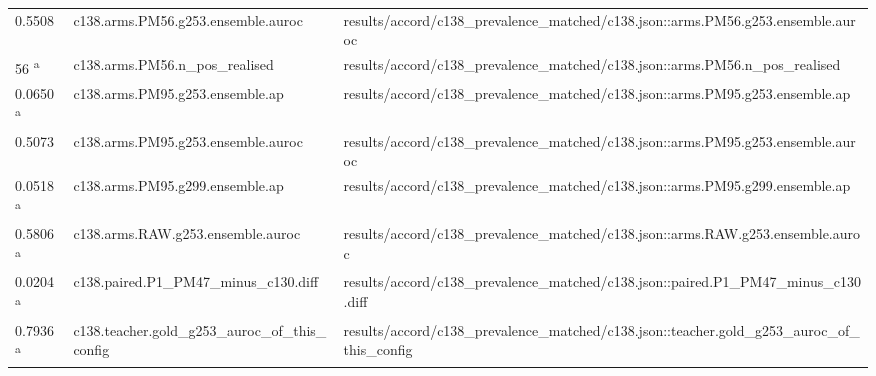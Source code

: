 \begin{longtable}{@{}p{0.7in}p{1.9in}p{2.6in}@{}}
0.5508 & c138.\allowbreak{}arms.\allowbreak{}PM56.\allowbreak{}g253.\allowbreak{}ensemble.\allowbreak{}auroc & results/\allowbreak{}accord/\allowbreak{}c138\_prevalence\_matched/\allowbreak{}c138.\allowbreak{}json::arms.\allowbreak{}PM56.\allowbreak{}g253.\allowbreak{}ensemble.\allowbreak{}auroc\\
56 \textsuperscript{a} & c138.\allowbreak{}arms.\allowbreak{}PM56.\allowbreak{}n\_pos\_realised & results/\allowbreak{}accord/\allowbreak{}c138\_prevalence\_matched/\allowbreak{}c138.\allowbreak{}json::arms.\allowbreak{}PM56.\allowbreak{}n\_pos\_realised\\
0.0650 \textsuperscript{a} & c138.\allowbreak{}arms.\allowbreak{}PM95.\allowbreak{}g253.\allowbreak{}ensemble.\allowbreak{}ap & results/\allowbreak{}accord/\allowbreak{}c138\_prevalence\_matched/\allowbreak{}c138.\allowbreak{}json::arms.\allowbreak{}PM95.\allowbreak{}g253.\allowbreak{}ensemble.\allowbreak{}ap\\
0.5073 & c138.\allowbreak{}arms.\allowbreak{}PM95.\allowbreak{}g253.\allowbreak{}ensemble.\allowbreak{}auroc & results/\allowbreak{}accord/\allowbreak{}c138\_prevalence\_matched/\allowbreak{}c138.\allowbreak{}json::arms.\allowbreak{}PM95.\allowbreak{}g253.\allowbreak{}ensemble.\allowbreak{}auroc\\
0.0518 \textsuperscript{a} & c138.\allowbreak{}arms.\allowbreak{}PM95.\allowbreak{}g299.\allowbreak{}ensemble.\allowbreak{}ap & results/\allowbreak{}accord/\allowbreak{}c138\_prevalence\_matched/\allowbreak{}c138.\allowbreak{}json::arms.\allowbreak{}PM95.\allowbreak{}g299.\allowbreak{}ensemble.\allowbreak{}ap\\
0.5806 \textsuperscript{a} & c138.\allowbreak{}arms.\allowbreak{}RAW.\allowbreak{}g253.\allowbreak{}ensemble.\allowbreak{}auroc & results/\allowbreak{}accord/\allowbreak{}c138\_prevalence\_matched/\allowbreak{}c138.\allowbreak{}json::arms.\allowbreak{}RAW.\allowbreak{}g253.\allowbreak{}ensemble.\allowbreak{}auroc\\
0.0204 \textsuperscript{a} & c138.\allowbreak{}paired.\allowbreak{}P1\_PM47\_minus\_c130.\allowbreak{}diff & results/\allowbreak{}accord/\allowbreak{}c138\_prevalence\_matched/\allowbreak{}c138.\allowbreak{}json::paired.\allowbreak{}P1\_PM47\_minus\_c130.\allowbreak{}diff\\
0.7936 \textsuperscript{a} & c138.\allowbreak{}teacher.\allowbreak{}gold\_g253\_auroc\_of\_this\_config & results/\allowbreak{}accord/\allowbreak{}c138\_prevalence\_matched/\allowbreak{}c138.\allowbreak{}json::teacher.\allowbreak{}gold\_g253\_auroc\_of\_this\_config\\

\end{longtable}
